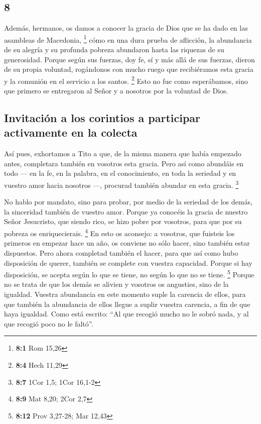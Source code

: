 \begin{paracol}{2}
\hypertarget{section-14}{%
\section{8}\label{section-14}}

 Además, hermanos, os damos a conocer la gracia de Dios
que se ha dado en las asambleas de Macedonia, \footnote{\textbf{8:1} Rom
  15,26}  cómo en una dura prueba de aflicción, la
abundancia de su alegría y su profunda pobreza abundaron hasta las
riquezas de su generosidad.  Porque según sus fuerzas, doy
fe, sí y más allá de sus fuerzas, dieron de su propia voluntad,
 rogándonos con mucho ruego que recibiéramos esta gracia y
la comunión en el servicio a los santos. \footnote{\textbf{8:4} Hech
  11,29}  Esto no fue como esperábamos, sino que primero
se entregaron al Señor y a nosotros por la voluntad de Dios.

\hypertarget{invitaciuxf3n-a-los-corintios-a-participar-activamente-en-la-colecta}{%
\subsection{Invitación a los corintios a participar activamente en la
colecta}\label{invitaciuxf3n-a-los-corintios-a-participar-activamente-en-la-colecta}}

 Así pues, exhortamos a Tito a que, de la misma manera que
había empezado antes, completara también en vosotros esta gracia.
 Pero así como abundáis en todo --- en la fe, en la
palabra, en el conocimiento, en toda la seriedad y en vuestro amor hacia
nosotros ---, procurad también abundar en esta gracia. \footnote{\textbf{8:7}
  1Cor 1,5; 1Cor 16,1-2}

 No hablo por mandato, sino para probar, por medio de la
seriedad de los demás, la sinceridad también de vuestro amor.
 Porque ya conocéis la gracia de nuestro Señor Jesucristo,
que siendo rico, se hizo pobre por vosotros, para que por su pobreza os
enriquecierais. \footnote{\textbf{8:9} Mat 8,20; 2Cor 2,7}
 En esto os aconsejo: a vosotros, que fuisteis los
primeros en empezar hace un año, os conviene no sólo hacer, sino también
estar dispuestos.  Pero ahora completad también el hacer,
para que así como hubo disposición de querer, también se complete con
vuestra capacidad.  Porque si hay disposición, se acepta
según lo que se tiene, no según lo que no se tiene. \footnote{\textbf{8:12}
  Prov 3,27-28; Mar 12,43}  Porque no se trata de que los
demás se alivien y vosotros os angusties,  sino de la
igualdad. Vuestra abundancia en este momento suple la carencia de ellos,
para que también la abundancia de ellos llegue a suplir vuestra
carencia, a fin de que haya igualdad.  Como está escrito:
``Al que recogió mucho no le sobró nada, y al que recogió poco no le
faltó''.


\end{paracol}
